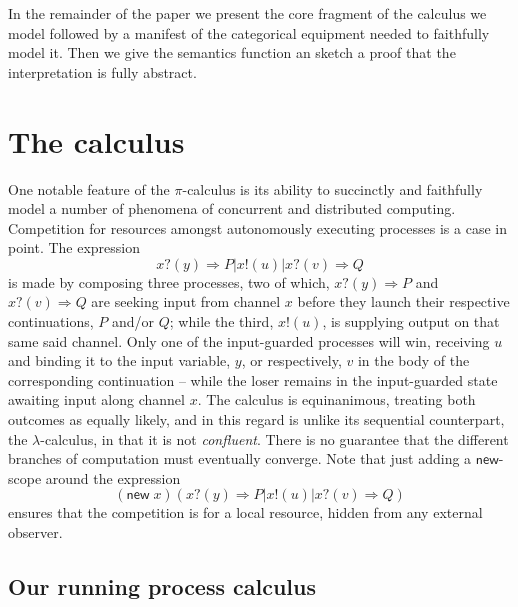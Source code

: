 \documentclass[]{acm_proc_article-sp}
\newcommand{\id}[1]{\texttt{#1}}
\newcommand{\juxtap}{\mathbin{\id{|}}}
\numberwithin{equation}{subsection}
\newcommand{\pic}{$\pi$-calculus}
\begin{document}
In the remainder of the paper we present the core fragment of the
calculus we model followed by a manifest of the categorical equipment
needed to faithfully model it. Then we give the semantics function an
sketch a proof that the interpretation is fully abstract.


\section{The calculus}

One notable feature of the {\pic} is its ability to succinctly and
faithfully model a number of phenomena of concurrent and distributed
computing. Competition for resources amongst autonomously executing
processes is a case in point. The expression
\begin{equation*}
  x?( y ) \Rightarrow P \juxtap x!( u ) \juxtap x?( v ) \Rightarrow Q
\end{equation*}
is made by composing three processes, two of which, $x?( y )
\Rightarrow P$ and $x?( v ) \Rightarrow Q$ are seeking input from
channel $x$ before they launch their respective continuations, $P$
and/or $Q$; while the third, $x!( u )$, is supplying output on that
same said channel. Only one of the input-guarded processes will win,
receiving $u$ and binding it to the input variable, $y$, or
respectively, $v$ in the body of the corresponding continuation --
while the loser remains in the input-guarded state awaiting input
along channel $x$. The calculus is equinanimous, treating both
outcomes as equally likely, and in this regard is unlike its
sequential counterpart, the $\lambda$-calculus, in that it is not
\emph{confluent}. There is no guarantee that the different branches of
computation must eventually converge. Note that just adding a
$\mathsf{new}$-scope around the expression
\begin{equation*}
  (\mathsf{new}\; x)( x?( y ) \Rightarrow P \juxtap x!( u ) \juxtap x?( v ) \Rightarrow Q )
\end{equation*}
ensures that the competition is for a local resource, hidden from any
external observer.

\subsection{Our running process calculus}
\end{document}
